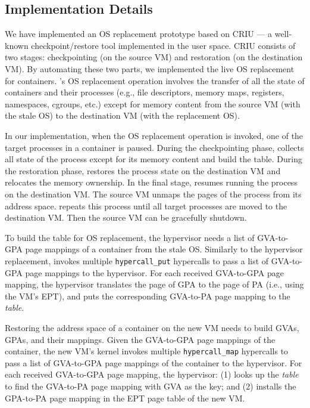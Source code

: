 \subsection{Implementation Details}
We have implemented an OS replacement prototype based on CRIU \cite{criu} --- a well-known checkpoint/restore tool implemented in the user space. CRIU consists of two stages: checkpointing (on the source VM) and restoration (on the destination VM). By automating these two parts, we implemented the live OS replacement for containers. \arch's OS replacement operation involves the transfer of all the state of containers and their processes (e.g., file descriptors, memory maps, registers, namespaces, cgroups, etc.) except for memory content from the source VM (with the stale OS) to the destination VM (with the replacement OS).

In our implementation, when the OS replacement operation is invoked, one of the target processes in a container is paused. During the checkpointing phase, \arch collects all state of the process except for its memory content and build the \arch table. During the restoration phase, \arch restores the process state on the destination VM and relocates the memory ownership. In the final stage, \arch resumes running the process on the destination VM. The source VM unmaps the pages of the process from its address space. \arch repeats this process until all target processes are moved to the destination VM. Then the source VM can be gracefully shutdown. 

To build the \arch table for OS replacement, the hypervisor needs a list of GVA-to-GPA page mappings of a container from the stale OS. Similarly to the hypervisor replacement, \arch invokes multiple \texttt{hypercall\_put} hypercalls to pass a list of GVA-to-GPA page mappings to the hypervisor. For each received GVA-to-GPA page mapping, the hypervisor translates the page of GPA to the page of PA (i.e., using the VM's EPT), and puts the corresponding GVA-to-PA page mapping to the {\em \arch table}.

Restoring the address space of a container on the new VM needs to build GVAs, GPAs, and their mappings. Given the GVA-to-GPA page mappings of the container, the new VM's kernel invokes multiple \texttt{hypercall\_map} hypercalls to pass a list of GVA-to-GPA page mappings of the container to the hypervisor. 
For each received GVA-to-GPA page mapping, the hypervisor: (1) looks up the {\em \arch table} to find the GVA-to-PA page mapping with GVA as the key; and (2) installs the GPA-to-PA page mapping in the EPT page table of the new VM. 

